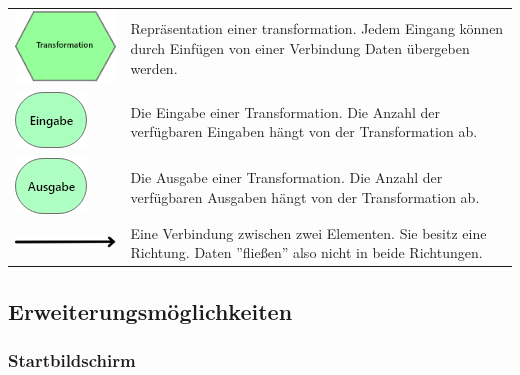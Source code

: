 \documentclass[parskip=full]{scrartcl}
\begin{document}
\begin{tabular}[t]{p{1cm} p{10cm}}
	\vspace{0cm}\includegraphics[width = 1 cm]{Grafik/Verbindungselement.png} & Repräsentation einer \gls{transformation}. Jedem Eingang können durch Einfügen von einer Verbindung Daten übergeben werden.\newline\\
	\vspace{0cm}\includegraphics[width = 1 cm]{Grafik/Eingabe-Verbindung.png} & Die Eingabe einer Transformation. Die Anzahl der verfügbaren Eingaben hängt von der Transformation ab.\newline\\
	\vspace{0cm}\includegraphics[width = 1 cm]{Grafik/Ausgabe-Transformation.png} & Die Ausgabe einer Transformation. Die Anzahl der verfügbaren Ausgaben hängt von der Transformation ab.\newline\\\cline{1-2}
	\vspace{0cm}\includegraphics[width = 1 cm]{Grafik/Verbindungspfeil.png} & Eine Verbindung zwischen zwei Elementen. Sie besitz eine Richtung. Daten ''fließen'' also nicht in beide Richtungen.\newline\\
\end{tabular}

\subsection{Erweiterungsmöglichkeiten}

\subsubsection{Startbildschirm}
\end{document}
